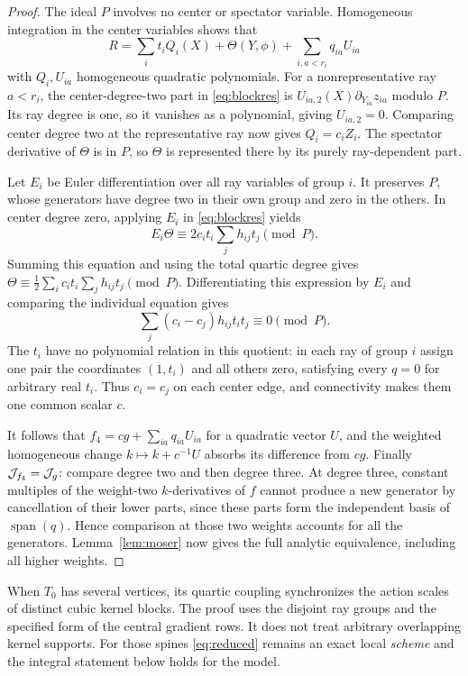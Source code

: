 \begin{proof}
The ideal \(P\) involves no center or spectator variable. Homogeneous integration in the center variables shows that
\[
 R=\sum_i t_i Q_i(X)+\Theta(Y,\phi)+\sum_{i,a<r_i}q_{ia}U_{ia}
\]
with \(Q_i,U_{ia}\) homogeneous quadratic polynomials. For a nonrepresentative ray \(a<r_i\), the center-degree-two part in \eqref{eq:blockres} is \(U_{ia,2}(X)\partial_{Y_{ia}}z_{ia}\) modulo \(P\). Its ray degree is one, so it vanishes as a polynomial, giving \(U_{ia,2}=0\). Comparing center degree two at the representative ray now gives \(Q_i=c_i Z_i\). The spectator derivative of \(\Theta\) is in \(P\), so \(\Theta\) is represented there by its purely ray-dependent part.

Let \(E_i\) be Euler differentiation over all ray variables of group \(i\). It preserves \(P\), whose generators have degree two in their own group and zero in the others. In center degree zero, applying \(E_i\) in \eqref{eq:blockres} yields
\[
 E_i\Theta\equiv 2c_i t_i\sum_j h_{ij}t_j\pmod P.
\]
Summing this equation and using the total quartic degree gives
\(\Theta\equiv \tfrac12\sum_i c_i t_i\sum_j h_{ij}t_j\pmod P\).
Differentiating this expression by \(E_i\) and comparing the individual equation gives
\[
                  \sum_j(c_i-c_j)h_{ij}t_i t_j\equiv 0\pmod P.
\]
The \(t_i\) have no polynomial relation in this quotient: in each ray of group \(i\) assign one pair the coordinates \((1,t_i)\) and all others zero, satisfying every \(q=0\) for arbitrary real \(t_i\). Thus \(c_i=c_j\) on each center edge, and connectivity makes them one common scalar \(c\).

It follows that \(f_4=cg+\sum_{ia}q_{ia}U_{ia}\) for a quadratic vector \(U\), and the weighted homogeneous change \(k\mapsto k+c^{-1}U\) absorbs its difference from \(cg\). Finally \(\mathcal J_{f_4}=\mathcal J_g\): compare degree two and then degree three. At degree three, constant multiples of the weight-two \(k\)-derivatives of \(f\) cannot produce a new generator by cancellation of their lower parts, since these parts form the independent basis of \(\operatorname{span}(q)\). Hence comparison at those two weights accounts for all the generators. Lemma~\ref{lem:moser} now gives the full analytic equivalence, including all higher weights.
\end{proof}

\begin{remark}
When \(T_0\) has several vertices, its quartic coupling synchronizes the action scales of distinct cubic kernel blocks. The proof uses the disjoint ray groups and the specified form of the central gradient rows. It does not treat arbitrary overlapping kernel supports. For those spines \eqref{eq:reduced} remains an exact local \emph{scheme} and the integral statement below holds for the model.
\end{remark}
